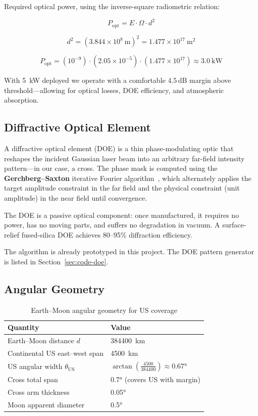 \documentclass[10pt,letterpaper]{article}
\begin{document}
Required optical power, using the inverse-square radiometric relation:

\[
  \boxed{P_{\text{opt}} = E \cdot \Omega \cdot d^2}
\]

\[
  d^2 = \left(3.844 \times 10^8\ \si{\meter}\right)^2
       = 1.477 \times 10^{17}\ \si{\meter\squared}
\]

\[
  P_{\text{opt}} = (10^{-9})\cdot(2.05 \times 10^{-5})\cdot(1.477 \times 10^{17})
                \approx \SI{3.0}{\kilo\watt}
\]

With \SI{5}{\kilo\watt} deployed we operate with a comfortable 4.5\,dB margin
above threshold---allowing for optical losses, DOE efficiency, and atmospheric
absorption.

\subsection{Diffractive Optical Element}

A diffractive optical element (DOE) is a thin phase-modulating optic that
reshapes the incident Gaussian laser beam into an arbitrary far-field intensity
pattern---in our case, a cross. The phase mask is computed using the
\textbf{Gerchberg--Saxton} iterative Fourier algorithm~\cite{GS1972}, which
alternately applies the target amplitude constraint in the far field and the
physical constraint (unit amplitude) in the near field until convergence.

The DOE is a passive optical component: once manufactured, it requires no
power, has no moving parts, and suffers no degradation in vacuum. A
surface-relief fused-silica DOE achieves 80--95\% diffraction efficiency.

The algorithm is already prototyped in this project. The DOE pattern generator
is listed in Section~\ref{sec:code-doe}.

\subsection{Angular Geometry}

\begin{table}[!ht]
\centering\small
\caption{Earth--Moon angular geometry for US coverage}
\label{tab:angular-geometry}
\begin{tabularx}{\linewidth}{lX}
\toprule
\textbf{Quantity} & \textbf{Value} \\
\midrule
Earth--Moon distance $d$ & \SI{384400}{\kilo\meter} \\
Continental US east--west span & \SI{4500}{\kilo\meter} \\
US angular width $\theta_{\text{US}}$ & $\arctan\!\left(\frac{4500}{384400}\right) \approx \ang{0.67}$ \\
Cross total span & \ang{0.7} (covers US with margin) \\
Cross arm thickness & \ang{0.05} \\
Moon apparent diameter & \ang{0.5} \\
\bottomrule
\end{tabularx}
\end{table}
\end{document}

